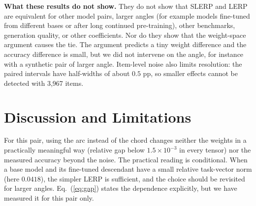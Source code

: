 \documentclass[conference]{IEEEtran}
\begin{document}
\textbf{What these results do not show.} They do not show that SLERP and LERP are equivalent for other model pairs, larger angles (for example models fine-tuned from different bases or after long continued pre-training), other benchmarks, generation quality, or other coefficients. Nor do they show that the weight-space argument causes the tie. The argument predicts a tiny weight difference and the accuracy difference is small, but we did not intervene on the angle, for instance with a synthetic pair of larger angle. Item-level noise also limits resolution: the paired intervals have half-widths of about $0.5$ pp, so smaller effects cannot be detected with 3{,}967 items.

\section{Discussion and Limitations}
For this pair, using the arc instead of the chord changes neither the weights in a practically meaningful way (relative gap below $1.5\times10^{-3}$ in every tensor) nor the measured accuracy beyond the noise. The practical reading is conditional. When a base model and its fine-tuned descendant have a small relative task-vector norm (here $0.0418$), the simpler LERP is sufficient, and the choice should be revisited for larger angles. Eq.~(\ref{eq:gap}) states the dependence explicitly, but we have measured it for this pair only.
\end{document}
